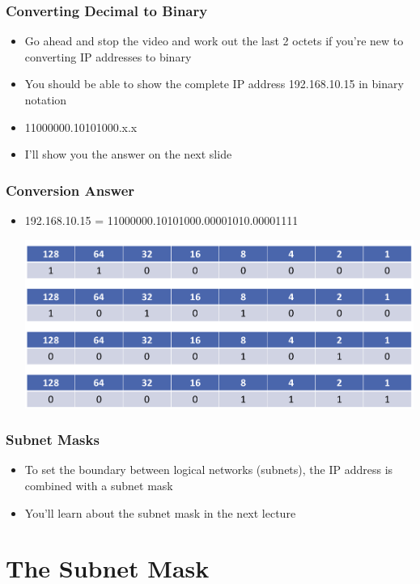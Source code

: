 \documentclass[pdflatex,compress]{beamer}
\begin{document}
\begin{frame}
	\frametitle{Converting Decimal to Binary}
	\begin{itemize}
		\item Go ahead and stop the video and work out the last 2 octets if you’re new to converting IP addresses to binary
		\item You should be able to show the complete IP address 192.168.10.15 in binary notation
		\item 11000000.10101000.x.x
		\item I’ll show you the answer on the next slide
	\end{itemize}	
\end{frame}

\begin{frame}
	\frametitle{Conversion Answer}
	\begin{itemize}
		\item 192.168.10.15 = 11000000.10101000.00001010.00001111
		\begin{center}
			\includegraphics[width=\linewidth]{img/img22}
		\end{center}
	\end{itemize}
\end{frame}

\begin{frame}
	\frametitle{Subnet Masks}
	\begin{itemize}
		\item To set the boundary between logical networks (subnets), the IP address is combined with a subnet mask
		\item You’ll learn about the subnet mask in the next lecture
	\end{itemize}
\end{frame}

\section{The Subnet Mask}
\end{document}
